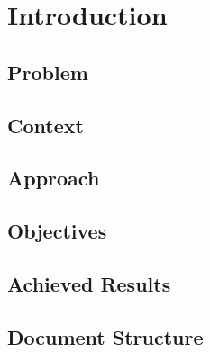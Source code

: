 \chapter{Introduction}
\label{chap:introduction} 

\section{Problem}
\label{sec:introduction:problem}

\section{Context}
\label{sec:introduction:context}

\section{Approach}
\label{sec:introduction:approach}

\section{Objectives}
\label{sec:introduction:objectives}

\section{Achieved Results}
\label{sec:introduction:achieved_results}

\section{Document Structure}
\label{sec:introduction:document_structure}
